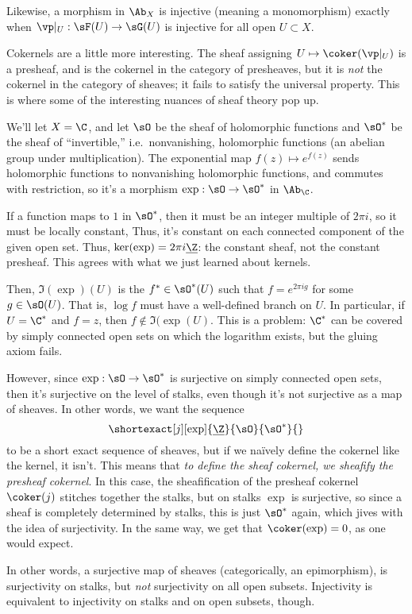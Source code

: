 Likewise, a morphism in \(\Ab_X\) is injective (meaning a monomorphism) exactly when
\(\vp|_U:\sF(U)\to\sG(U)\) is injective for all open \(U\subset X\).

Cokernels are a little more interesting. The sheaf assigning \(U\mapsto\coker(\vp|_U)\) is a presheaf, and is the
cokernel in the category of presheaves, but it is \emph{not} the cokernel in the category of sheaves; it fails to
satisfy the universal property. This is where some of the interesting nuances of sheaf theory pop up.
\begin{exm}
\label{notcoker}
We'll let \(X = \C\), and let \(\sO\) be the sheaf of holomorphic functions and \(\sO^*\) be the sheaf of
``invertible,'' i.e.\ nonvanishing, holomorphic functions (an abelian group under multiplication). The exponential
map \(f(z)\mapsto e^{f(z)}\) sends holomorphic functions to nonvanishing holomorphic functions, and commutes with
restriction, so it's a morphism \(\exp:\sO\to\sO^*\) in \(\Ab_\C\).

If a function maps to \(1\) in \(\sO^*\), then it must be an integer multiple of \(2\pi i\), so it must be locally
constant, Thus, it's constant on each connected component of the given open set. Thus, \(\ker(\exp) = 2\pi
i\underline\Z\): the constant sheaf, not the constant presheaf. This agrees with what we just learned about
kernels.

Then, \(\Im(\exp)(U)\) is the \(f^*\in\sO^*(U)\) such that \(f = e^{2\pi i g}\) for some \(g\in\sO(U)\). That is,
\(\log f\) must have a well-defined branch on \(U\). In particular, if \(U = \C^*\) and \(f = z\), then
\(f\not\in\Im(\exp(U)\). This is a problem: \(\C^*\) can be covered by simply connected open sets on which the
logarithm exists, but the gluing axiom fails.

However, since \(\exp:\sO\to\sO^*\) is surjective on simply connected open sets, then it's surjective on the level
of stalks, even though it's not surjective as a map of sheaves. In other words, we want the sequence
\[\shortexact[j][\exp]{\underline\Z}{\sO}{\sO^*}{}\]
to be a short exact sequence of sheaves, but if we naïvely define the cokernel like the kernel, it isn't. This
means that \emph{to define the sheaf cokernel, we sheafify the presheaf cokernel}. In this case, the sheafification
of the presheaf cokernel \(\coker(j)\) stitches together the stalks, but on stalks \(\exp\) is surjective, so since
a sheaf is completely determined by stalks, this is just \(\sO^*\) again, which jives with the idea of
surjectivity. In the same way, we get that \(\coker(\exp) = 0\), as one would expect.
\end{exm}
In other words, a surjective map of sheaves (categorically, an epimorphism), is surjectivity on stalks, but
\emph{not} surjectivity on all open subsets. Injectivity is equivalent to injectivity on stalks and on open
subsets, though.

